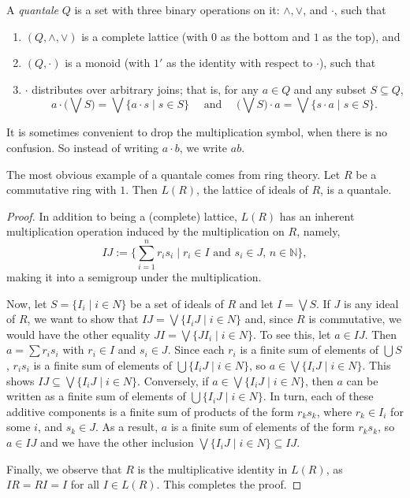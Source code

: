 \documentclass[12pt]{article}
\begin{document}
A \emph{quantale} $Q$ is a set with three binary operations on it: $\wedge,\vee$, and $\cdot$, such that 
\begin{enumerate}
\item $(Q,\wedge,\vee)$ is a complete lattice (with $0$ as the bottom and $1$ as the top), and
\item $(Q,\cdot)$ is a monoid (with $1'$ as the identity with respect to $\cdot$), such that
\item $\cdot$ distributes over arbitrary joins; that is, for any $a\in Q$ and any subset $S\subseteq Q$,
$$a\cdot\big(\bigvee S\big)=\bigvee \lbrace a\cdot s\mid s\in S\rbrace\quad\mbox{ and }\quad \big(\bigvee S\big) \cdot a=\bigvee \lbrace s \cdot a\mid s\in S\rbrace.$$
\end{enumerate}
It is sometimes convenient to drop the multiplication symbol, when there is no confusion.  So instead of writing $a\cdot b$, we write $ab$.

The most obvious example of a quantale comes from ring theory.  Let $R$ be a commutative ring with $1$.  Then $L(R)$, the lattice of ideals of $R$, is a quantale.  
\begin{proof}
In addition to being a (complete) lattice, $L(R)$ has an inherent multiplication operation induced by the multiplication on $R$, namely, $$IJ:=\lbrace \sum_{i=1}^n r_is_i\mid r_i\in I\mbox{ and }s_i\in J\mbox{, }n\in\mathbb{N}\rbrace,$$ making it into a semigroup under the multiplication.  

Now, let $S=\lbrace I_i\mid i\in N\rbrace$ be a set of ideals of $R$ and let $I=\bigvee S$.  If $J$ is any ideal of $R$, we want to show that $IJ=\bigvee \lbrace I_iJ\mid i\in N\rbrace$ and, since $R$ is commutative, we would have the other equality $JI=\bigvee \lbrace JI_i\mid i\in N \rbrace$.  To see this, let $a\in IJ$.  Then $a=\sum r_is_i$ with $r_i\in I$ and $s_i\in J$.  Since each $r_i$ is a finite sum of elements of $\bigcup S$, $r_is_i$ is a finite sum of elements of $\bigcup\lbrace I_iJ\mid i\in N\rbrace$, so $a\in \bigvee \lbrace I_iJ\mid i\in N\rbrace$.  This shows $IJ\subseteq \bigvee \lbrace I_iJ\mid i\in N\rbrace$.  Conversely, if $a\in \bigvee \lbrace I_iJ\mid i\in N\rbrace$, then $a$ can be written as a finite sum of elements of $\bigcup \lbrace I_iJ\mid i\in N\rbrace$.  In turn, each of these additive components is a finite sum of products of the form $r_ks_k$, where $r_k\in I_i$ for some $i$, and $s_k\in J$.  As a result, $a$ is a finite sum of elements of the form $r_ks_k$, so $a\in IJ$ and we have the other inclusion $\bigvee \lbrace I_iJ\mid i\in N\rbrace \subseteq IJ$.

Finally, we observe that $R$ is the multiplicative identity in $L(R)$, as $IR=RI=I$ for all $I\in L(R)$.  This completes the proof.
\end{proof}
\end{document}
